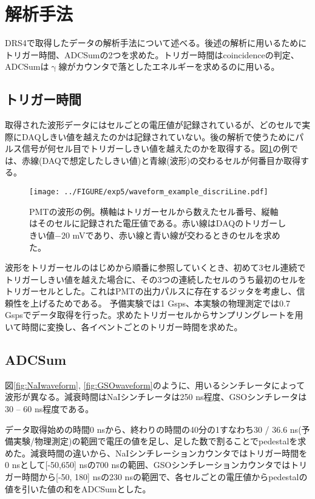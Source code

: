 \documentclass[../../main.tex]{subfiles}
\numberwithin{equation}{section}
\numberwithin{table}{section}
\numberwithin{figure}{section}
\begin{document}
\section{解析手法}
DRS4で取得したデータの解析手法について述べる。後述の解析に用いるためにトリガー時間、ADCSumの2つを求めた。トリガー時間はcoincidenceの判定、ADCSumは$\upgamma$線がカウンタで落としたエネルギーを求めるのに用いる。

\subsection{トリガー時間}\label{sec:trigger_time}
取得された波形データにはセルごとの電圧値が記録されているが、どのセルで実際にDAQしきい値を越えたのかは記録されていない。後の解析で使うためにパルス信号が何セル目でトリガーしきい値を越えたのかを取得する。図\ref{fig:waveform_example_discriLine}の例では、赤線(DAQで想定したしきい値)と青線(波形)の交わるセルが何番目か取得する。

				\begin{figure}[H]
					\centering
					\texttt{[image: ../FIGURE/exp5/waveform\_example\_discriLine.pdf]}
					\caption{PMTの波形の例。横軸はトリガーセルから数えたセル番号、縦軸はそのセルに記録された電圧値である。赤い線はDAQのトリガーしきい値$-20$ \si{\milli\volt}であり、赤い線と青い線が交わるときのセルを求めた。}
					\label{fig:waveform_example_discriLine}
				\end{figure}

        波形をトリガーセルのはじめから順番に参照していくとき、初めて3セル連続でトリガーしきい値を越えた場合に、その3つの連続したセルのうち最初のセルをトリガーセルとした。これはPMTの出力パルスに存在するジッタを考慮し、信頼性を上げるためである。
        予備実験では1 Gsps、本実験の物理測定では0.7 Gspsでデータ取得を行った。求めたトリガーセルからサンプリングレートを用いて時間に変換し、各イベントごとのトリガー時間を求めた。

\subsection{ADCSum}
図\ref{fig:NaIwaveform}, \ref{fig:GSOwaveform}のように、用いるシンチレータによって波形が異なる。減衰時間はNaIシンチレータは250 ns程度、GSOシンチレータは30 -- 60 ns程度である。

データ取得始めの時間0 nsから、終わりの時間の40分の1すなわち30 / 36.6 ns(予備実験/物理測定)の範囲で電圧の値を足し、足した数で割ることでpedestalを求めた。減衰時間の違いから、NaIシンチレーションカウンタではトリガー時間を0 nsとして[-50,650] nsの700 nsの範囲、GSOシンチレーションカウンタではトリガー時間から[-50, 180] nsの230 nsの範囲で、各セルごとの電圧値からpedestalの値を引いた値の和をADCSumとした。
\end{document}
